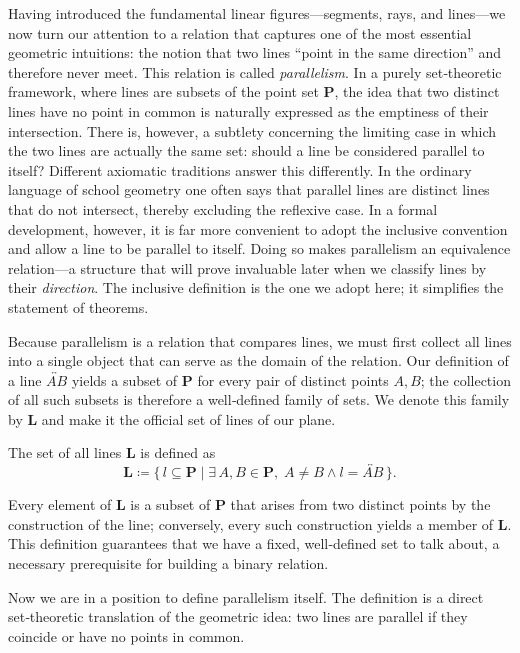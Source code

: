 \documentclass[../../../main/main.tex]{subfiles}
\begin{document}
Having introduced the fundamental linear figures—segments, rays, and lines—we now turn our attention to a relation that captures one of the most essential geometric intuitions: the notion that two lines ``point in the same direction'' and therefore never meet.  This relation is called \textit{parallelism}.  In a purely set‑theoretic framework, where lines are subsets of the point set \(\mathbf{P}\), the idea that two distinct lines have no point in common is naturally expressed as the emptiness of their intersection.  There is, however, a subtlety concerning the limiting case in which the two lines are actually the same set: should a line be considered parallel to itself?  Different axiomatic traditions answer this differently.  In the ordinary language of school geometry one often says that parallel lines are distinct lines that do not intersect, thereby excluding the reflexive case.  In a formal development, however, it is far more convenient to adopt the inclusive convention and allow a line to be parallel to itself.  Doing so makes parallelism an equivalence relation—a structure that will prove invaluable later when we classify lines by their \textit{direction}.  The inclusive definition is the one we adopt here; it simplifies the statement of theorems.

Because parallelism is a relation that compares lines, we must first collect all lines into a single object that can serve as the domain of the relation.  Our definition of a line \(\overleftrightarrow{AB}\) yields a subset of \(\mathbf{P}\) for every pair of distinct points \(A,B\); the collection of all such subsets is therefore a well‑defined family of sets.  We denote this family by \(\mathbf{L}\) and make it the official set of lines of our plane.

\begin{definition}
  The set of all lines \(\mathbf{L}\) is defined as
  \[
  \mathbf{L} \coloneqq \{\, l \subseteq \mathbf{P} \mid
  \exists\, A,B \in \mathbf{P},\; A \neq B \land l = \overleftrightarrow{AB} \,\}.
  \]
\end{definition}

\noindent
Every element of \(\mathbf{L}\) is a subset of \(\mathbf{P}\) that arises from two distinct points by the construction of the line; conversely, every such construction yields a member of \(\mathbf{L}\).  This definition guarantees that we have a fixed, well‑defined set to talk about, a necessary prerequisite for building a binary relation.

Now we are in a position to define parallelism itself.  The definition is a direct set‑theoretic translation of the geometric idea: two lines are parallel if they coincide or have no points in common.
\end{document}
